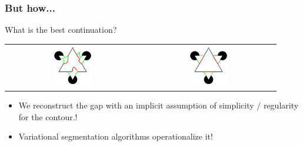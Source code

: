 \documentclass[10pt]{beamer}
\begin{document}
\begin{frame}
  \frametitle{But how...}
  What is the best continuation?
   \begin{center}
     \begin{tabular}[h]{cc}
        \includegraphics[width=0.3\textwidth]{IMAGES/kanizsa1bad} &
      \includegraphics[width=0.3\textwidth]{IMAGES/kanizsa1ok} \\
     \end{tabular}
   \end{center}
   \begin{itemize}
   \item    We reconstruct the gap with an implicit assumption of simplicity / regularity for the contour.!
   \item  Variational segmentation algorithms operationalize it!
   \end{itemize}

\end{frame}
\end{document}
